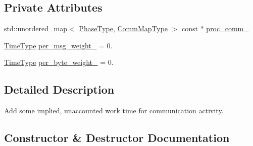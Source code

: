 \subsection*{Private Attributes}
\begin{DoxyCompactItemize}
\item 
std\+::unordered\+\_\+map$<$ \hyperlink{namespacevt_a46ce6733d5cdbd735d561b7b4029f6d7}{Phase\+Type}, \hyperlink{namespacevt_1_1vrt_1_1collection_1_1balance_a01ee1fb0ae2da1d2ab7fdca3be9ae351}{Comm\+Map\+Type} $>$ const  $\ast$ \hyperlink{structvt_1_1vrt_1_1collection_1_1balance_1_1_comm_overhead_a6c5e0954d01ac8c05a44dfabdc053e0e}{proc\+\_\+comm\+\_\+}
\item 
\hyperlink{namespacevt_a876a9d0cd5a952859c72de8a46881442}{Time\+Type} \hyperlink{structvt_1_1vrt_1_1collection_1_1balance_1_1_comm_overhead_a5767b946ab89c461f3387825e8ef86df}{per\+\_\+msg\+\_\+weight\+\_\+} = 0.
\item 
\hyperlink{namespacevt_a876a9d0cd5a952859c72de8a46881442}{Time\+Type} \hyperlink{structvt_1_1vrt_1_1collection_1_1balance_1_1_comm_overhead_a35c4dcc20558f0f5092f9d5ab2e1a662}{per\+\_\+byte\+\_\+weight\+\_\+} = 0.
\end{DoxyCompactItemize}


\subsection{Detailed Description}
Add some implied, unaccounted work time for communication activity. 

\subsection{Constructor \& Destructor Documentation}
\mbox{\label{structvt_1_1vrt_1_1collection_1_1balance_1_1_comm_overhead_af918fee4ae0360d93c19442945e9c3d4}} 

